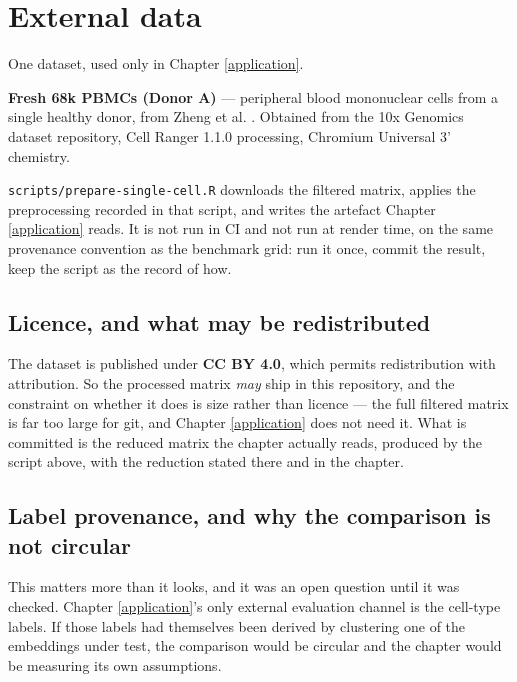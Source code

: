 \documentclass[
  british,
  a4paper,
]{book}
\begin{document}
\section*{External data}\label{datasets-external}

One dataset, used only in Chapter \ref{application}.

\textbf{Fresh 68k PBMCs (Donor A)} --- peripheral blood mononuclear cells from a single
healthy donor, from Zheng et al. \citep{zheng2017massively}. Obtained from the 10x
Genomics dataset repository, Cell Ranger 1.1.0 processing, Chromium Universal
3' chemistry.

\texttt{scripts/prepare-single-cell.R} downloads the filtered matrix, applies the
preprocessing recorded in that script, and writes the artefact Chapter
\ref{application} reads. It is not run in CI and not run at render time, on the
same provenance convention as the benchmark grid: run it once, commit the
result, keep the script as the record of how.

\subsection*{Licence, and what may be redistributed}\label{licence-and-what-may-be-redistributed}

The dataset is published under \textbf{CC BY 4.0}, which permits redistribution with
attribution. So the processed matrix \emph{may} ship in this repository, and the
constraint on whether it does is size rather than licence --- the full filtered
matrix is far too large for git, and Chapter \ref{application} does not need
it. What is committed is the reduced matrix the chapter actually reads,
produced by the script above, with the reduction stated there and in the
chapter.

\subsection*{Label provenance, and why the comparison is not circular}\label{label-provenance-and-why-the-comparison-is-not-circular}

This matters more than it looks, and it was an open question until it was
checked. Chapter \ref{application}'s only external evaluation channel is the
cell-type labels. If those labels had themselves been derived by clustering one
of the embeddings under test, the comparison would be circular and the chapter
would be measuring its own assumptions.
\end{document}
